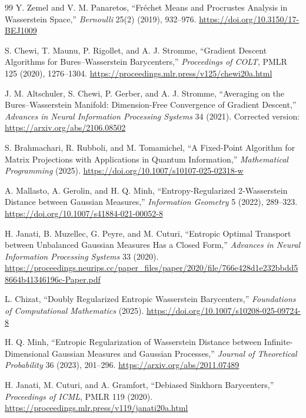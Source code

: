 \documentclass[11pt]{article}
\theoremstyle{definition}
\begin{document}
\begin{thebibliography}{99}
Y. Zemel and V. M. Panaretos,
``Fr\'echet Means and Procrustes Analysis in Wasserstein Space,''
\emph{Bernoulli} 25(2) (2019), 932--976.
\url{https://doi.org/10.3150/17-BEJ1009}

S. Chewi, T. Maunu, P. Rigollet, and A. J. Stromme,
``Gradient Descent Algorithms for Bures--Wasserstein Barycenters,''
\emph{Proceedings of COLT}, PMLR 125 (2020), 1276--1304.
\url{https://proceedings.mlr.press/v125/chewi20a.html}

J. M. Altschuler, S. Chewi, P. Gerber, and A. J. Stromme,
``Averaging on the Bures--Wasserstein Manifold: Dimension-Free Convergence of
Gradient Descent,''
\emph{Advances in Neural Information Processing Systems} 34 (2021).
Corrected version: \url{https://arxiv.org/abs/2106.08502}

S. Brahmachari, R. Rubboli, and M. Tomamichel,
``A Fixed-Point Algorithm for Matrix Projections with Applications in Quantum
Information,''
\emph{Mathematical Programming} (2025).
\url{https://doi.org/10.1007/s10107-025-02318-w}

A. Mallasto, A. Gerolin, and H. Q. Minh,
``Entropy-Regularized 2-Wasserstein Distance between Gaussian Measures,''
\emph{Information Geometry} 5 (2022), 289--323.
\url{https://doi.org/10.1007/s41884-021-00052-8}

H. Janati, B. Muzellec, G. Peyre, and M. Cuturi,
``Entropic Optimal Transport between Unbalanced Gaussian Measures Has a
Closed Form,''
\emph{Advances in Neural Information Processing Systems} 33 (2020).
\url{https://proceedings.neurips.cc/paper_files/paper/2020/file/766e428d1e232bbdd58664b41346196c-Paper.pdf}

L. Chizat,
``Doubly Regularized Entropic Wasserstein Barycenters,''
\emph{Foundations of Computational Mathematics} (2025).
\url{https://doi.org/10.1007/s10208-025-09724-8}

H. Q. Minh,
``Entropic Regularization of Wasserstein Distance between Infinite-Dimensional
Gaussian Measures and Gaussian Processes,''
\emph{Journal of Theoretical Probability} 36 (2023), 201--296.
\url{https://arxiv.org/abs/2011.07489}

H. Janati, M. Cuturi, and A. Gramfort,
``Debiased Sinkhorn Barycenters,''
\emph{Proceedings of ICML}, PMLR 119 (2020).
\url{https://proceedings.mlr.press/v119/janati20a.html}


\end{thebibliography}
\end{document}
